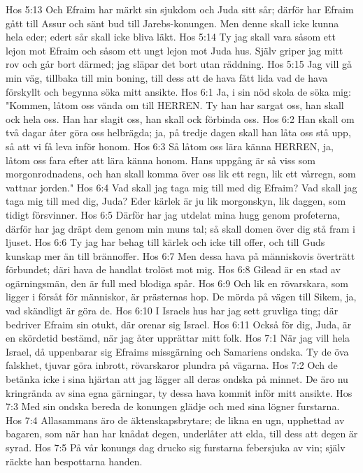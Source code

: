 Hos 5:13  Och Efraim har märkt sin sjukdom och Juda sitt sår; därför har Efraim gått till Assur och sänt bud till Jarebs-konungen. Men denne skall icke kunna hela eder; edert sår skall icke bliva läkt.
Hos 5:14  Ty jag skall vara såsom ett lejon mot Efraim och såsom ett ungt lejon mot Juda hus. Själv griper jag mitt rov och går bort därmed; jag släpar det bort utan räddning.
Hos 5:15  Jag vill gå min väg, tillbaka till min boning, till dess att de hava fått lida vad de hava förskyllt och begynna söka mitt ansikte.
Hos 6:1  Ja, i sin nöd skola de söka mig: "Kommen, låtom oss vända om till HERREN. Ty han har sargat oss, han skall ock hela oss. Han har slagit oss, han skall ock förbinda oss.
Hos 6:2  Han skall om två dagar åter göra oss helbrägda; ja, på tredje dagen skall han låta oss stå upp, så att vi få leva inför honom.
Hos 6:3  Så låtom oss lära känna HERREN, ja, låtom oss fara efter att lära känna honom. Hans uppgång är så viss som morgonrodnadens, och han skall komma över oss lik ett regn, lik ett vårregn, som vattnar jorden."
Hos 6:4  Vad skall jag taga mig till med dig Efraim? Vad skall jag taga mig till med dig, Juda? Eder kärlek är ju lik morgonskyn, lik daggen, som tidigt försvinner.
Hos 6:5  Därför har jag utdelat mina hugg genom profeterna, därför har jag dräpt dem genom min muns tal; så skall domen över dig stå fram i ljuset.
Hos 6:6  Ty jag har behag till kärlek och icke till offer, och till Guds kunskap mer än till brännoffer.
Hos 6:7  Men dessa hava på människovis överträtt förbundet; däri hava de handlat trolöst mot mig.
Hos 6:8  Gilead är en stad av ogärningsmän, den är full med blodiga spår.
Hos 6:9  Och lik en rövarskara, som ligger i försåt för människor, är prästernas hop. De mörda på vägen till Sikem, ja, vad skändligt är göra de.
Hos 6:10  I Israels hus har jag sett gruvliga ting; där bedriver Efraim sin otukt, där orenar sig Israel.
Hos 6:11  Också för dig, Juda, är en skördetid bestämd, när jag åter upprättar mitt folk.
Hos 7:1  När jag vill hela Israel, då uppenbarar sig Efraims missgärning och Samariens ondska. Ty de öva falskhet, tjuvar göra inbrott, rövarskaror plundra på vägarna.
Hos 7:2  Och de betänka icke i sina hjärtan att jag lägger all deras ondska på minnet. De äro nu kringrända av sina egna gärningar, ty dessa hava kommit inför mitt ansikte.
Hos 7:3  Med sin ondska bereda de konungen glädje och med sina lögner furstarna.
Hos 7:4  Allasammans äro de äktenskapsbrytare; de likna en ugn, upphettad av bagaren, som när han har knådat degen, underlåter att elda, till dess att degen är syrad.
Hos 7:5  På vår konungs dag drucko sig furstarna febersjuka av vin; själv räckte han bespottarna handen.
